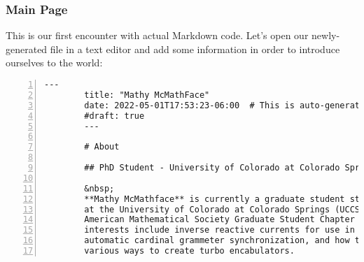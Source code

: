 \begin{frame}[fragile]
    \frametitle{Main Page}
    
    This is our first encounter with actual Markdown code. Let's open our newly-generated file
    in a text editor and add some information in order to introduce ourselves to the world:

    \vfill

    \begin{lstlisting}[style=saneCode,gobble=8,title={content/\_index.md},numbers=left]
        ---
        title: "Mathy McMathFace"
        date: 2022-05-01T17:53:23-06:00  # This is auto-generated - no need to modify this!
        #draft: true
        ---
        
        # About
        
        ## PhD Student - University of Colorado at Colorado Springs
        
        &nbsp;
        **Mathy McMathface** is currently a graduate student studying Mathematics
        at the University of Colorado at Colorado Springs (UCCS) and is an officer in the
        American Mathematical Society Graduate Student Chapter at UCCS. Their research
        interests include inverse reactive currents for use in unilateral phase detractors,
        automatic cardinal grammeter synchronization, and how these two may be combined in
        various ways to create turbo encabulators.
    \end{lstlisting}
\end{frame}